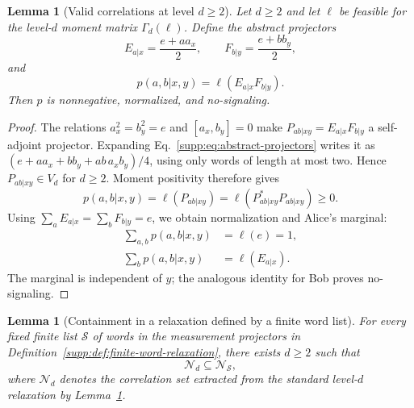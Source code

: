 \documentclass[aps,prl,onecolumn,10pt,superscriptaddress,nofootinbib,longbibliography]{revtex4-2}
\newtheorem{lemma}[theorem]{Lemma}
\theoremstyle{remark}
\begin{document}
\begin{lemma}[Valid correlations at level $d\geq2$]
\label{supp:lem:valid-behavior}
Let $d\geq2$ and let $\ell$ be feasible for the level-$d$ moment matrix $\Gamma_d(\ell)$. Define the abstract projectors
\begin{equation}
E_{a|x}=\frac{e+aa_x}{2},
\qquad
F_{b|y}=\frac{e+bb_y}{2},
\label{supp:eq:abstract-projectors}
\end{equation}
and
\begin{equation}
p(a,b|x,y)=\ell(E_{a|x}F_{b|y}).
\label{supp:eq:extracted-probability}
\end{equation}
Then $p$ is nonnegative, normalized, and no-signaling.
\end{lemma}

\begin{proof}
The relations $a_x^2=b_y^2=e$ and $[a_x,b_y]=0$ make $P_{ab|xy}=E_{a|x}F_{b|y}$ a self-adjoint projector. Expanding Eq.~\eqref{supp:eq:abstract-projectors} writes it as $(e+aa_x+bb_y+ab\,a_xb_y)/4$, using only words of length at most two. Hence $P_{ab|xy}\in V_d$ for $d\geq2$. Moment positivity therefore gives
\begin{equation}
p(a,b|x,y)=\ell(P_{ab|xy})
=\ell(P_{ab|xy}^*P_{ab|xy})\geq0.
\label{supp:eq:probability-positive}
\end{equation}
Using $\sum_aE_{a|x}=\sum_bF_{b|y}=e$, we obtain normalization and Alice's marginal:
\begin{align}
\sum_{a,b}p(a,b|x,y)&=\ell(e)=1,
\label{supp:eq:probability-normalization}\\
\sum_b p(a,b|x,y)&=\ell(E_{a|x}).
\label{supp:eq:no-signaling-A}
\end{align}
The marginal is independent of $y$; the analogous identity for Bob proves no-signaling.
\end{proof}

\begin{lemma}[Containment in a relaxation defined by a finite word list]
\label{supp:lem:finite-list-containment}
For every fixed finite list $\mathcal S$ of words in the measurement projectors in Definition~\ref{supp:def:finite-word-relaxation}, there exists $d\geq2$ such that
\begin{equation}
\mathcal N_d\subseteq\mathcal N_{\mathcal S},
\label{supp:eq:relaxation-containment}
\end{equation}
where $\mathcal N_d$ denotes the correlation set extracted from the standard level-$d$ relaxation by Lemma~\ref{supp:lem:valid-behavior}.
\end{lemma}
\end{document}
